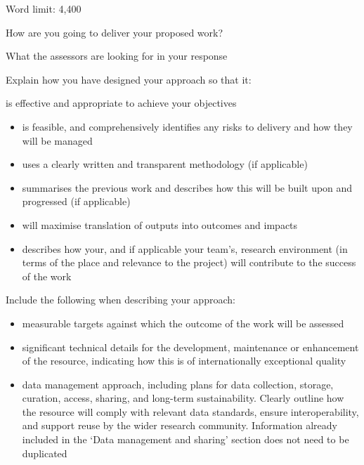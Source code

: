 \documentclass[11pt]{article}
\newenvironment{instruction}{%
    \begin{tcolorbox}[breakable,colback=red!5,colframe=red,title=Instruction]%
	}{%
    	\end{tcolorbox}%
	}
\begin{document}
\begin{instruction}

Word limit: 4,400

How are you going to deliver your proposed work?

What the assessors are looking for in your response

Explain how you have designed your approach so that it:

is effective and appropriate to achieve your objectives

\begin{itemize}

	\item is feasible, and comprehensively identifies any risks to delivery and
	how they will be managed

	\item uses a clearly written and transparent methodology (if applicable)

	\item summarises the previous work and describes how this will be built
	upon and progressed (if applicable)

	\item will maximise translation of outputs into outcomes and impacts

	\item describes how your, and if applicable your team’s, research
	environment (in terms of the place and relevance to the project) will
	contribute to the success of the work

\end{itemize}

Include the following when describing your approach:

\begin{itemize}

	\item measurable targets against which the outcome of the work will be
	assessed

	\item significant technical details for the development, maintenance or
	enhancement of the resource, indicating how this is of internationally
	exceptional quality

	\item data management approach, including plans for data collection,
	storage, curation, access, sharing, and long-term sustainability. Clearly
	outline how the resource will comply with relevant data standards, ensure
	interoperability, and support reuse by the wider research community.
	Information already included in the ‘Data management and sharing’ section
	does not need to be duplicated


\end{itemize}
\end{instruction}
\end{document}
